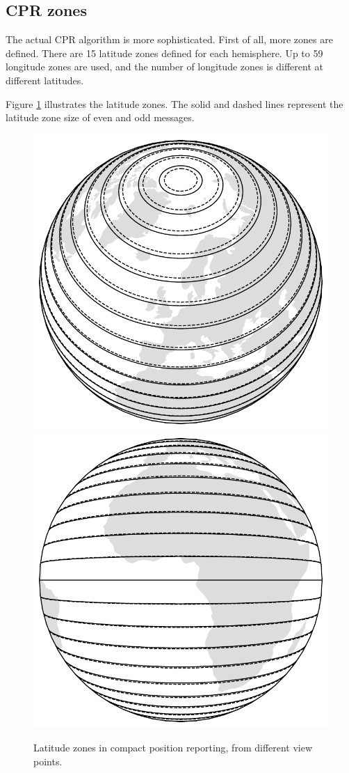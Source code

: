 \subsection{CPR zones}
The actual CPR algorithm is more sophisticated. First of all, more zones are defined. There are 15 latitude zones defined for each hemisphere. Up to 59 longitude zones are used, and the number of longitude zones is different at different latitudes.

Figure \ref{fig:cpr_lat_zones} illustrates the latitude zones. The solid and dashed lines represent the latitude zone size of even and odd messages.

\begin{figure}
  \includegraphics[width=0.7\linewidth]{figures/adsb/cpr_lat_zone_high.pdf} 
  \\
  \vspace{0.5cm}
  \includegraphics[width=0.7\linewidth]{figures/adsb/cpr_lat_zone_low.pdf}
  \caption{Latitude zones in compact position reporting, from different view points.}
  \label{fig:cpr_lat_zones}
\end{figure}

